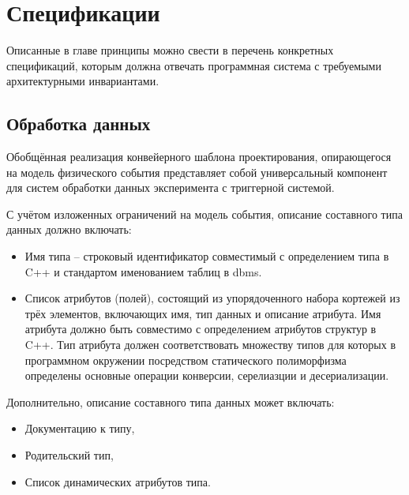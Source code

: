 \section{Спецификации}

Описанные в главе принципы можно свести в перечень
конкретных спецификаций, которым должна отвечать программная
система с требуемыми архитектурными инвариантами.

\subsection{Обработка данных}

Обобщённая реализация конвейерного шаблона проектирования, опирающегося
на модель физического события представляет собой универсальный компонент
для систем обработки данных эксперимента с триггерной
системой.

С учётом изложенных ограничений на модель события,
описание составного типа данных должно включать:
\begin{itemize}
    \item Имя типа -- строковый идентификатор совместимый
    с определением типа в C++ и стандартом именованием таблиц
    в \acrshort{dbms}.
    \item Список атрибутов (полей), состоящий из
    упорядоченного набора кортежей из трёх элементов, включающих
    имя, тип данных и описание атрибута. Имя атрибута
    должно быть совместимо с определением атрибутов структур в C++.
    Тип атрибута должен соответствовать множеству типов для которых в
    программном окружении посредством статического полиморфизма определены
    основные операции конверсии, серелиазции и десериализации.
\end{itemize}
Дополнительно, описание составного типа данных может включать:
\begin{itemize}
    \item Документацию к типу,
    \item Родительский тип,
    \item Список динамических атрибутов типа.
\end{itemize}

